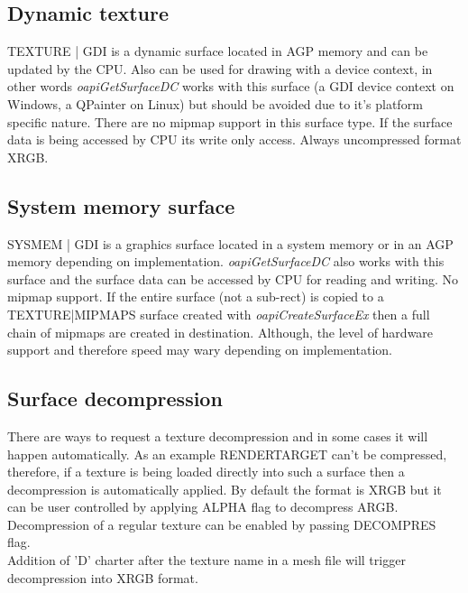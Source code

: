 \documentclass[Orbiter Developer Manual.tex]{subfiles}
\begin{document}
\subsection{Dynamic texture}
\textsc{TEXTURE | GDI} is a dynamic surface located in AGP memory and can be updated by the CPU. Also can be used for drawing with a device context, in other words \textit{oapiGetSurfaceDC} works with this surface (a GDI device context on Windows, a QPainter on Linux) but should be avoided due to it's platform specific nature. There are no mipmap support in this surface type. If the surface data is being accessed by CPU its write only access. Always uncompressed format XRGB.

\subsection{System memory surface}
\textsc{SYSMEM | GDI} is a graphics surface located in a system memory or in an AGP memory depending on implementation.  \textit{oapiGetSurfaceDC} also works with this surface and the surface data can be accessed by CPU for reading and writing. No mipmap support. If the entire surface (not a sub-rect) is copied to a \textsc{TEXTURE|MIPMAPS} surface created with \textit{oapiCreateSurfaceEx} then a full chain of mipmaps are created in destination. Although, the level of hardware support and therefore speed may wary depending on implementation. 

\subsection{Surface decompression}
There are ways to request a texture decompression and in some cases it will happen automatically. As an example \textsc{RENDERTARGET} can't be compressed, therefore, if a texture is being loaded directly into such a surface then a decompression is automatically applied. By default the format is XRGB but it can be user controlled by applying \textsc{ALPHA} flag to decompress ARGB. Decompression of a regular texture can be enabled by passing \textsc{DECOMPRES} flag.\\

Addition of 'D' charter after the texture name in a mesh file will trigger decompression into XRGB format.
\end{document}
